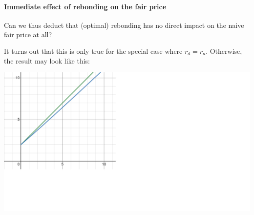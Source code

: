 \documentclass{article}
\begin{document}





\paragraph{Immediate effect of rebonding on the fair price}
Can we thus deduct that (optimal) rebonding has no direct impact on the naive fair price at all?

It turns out that this is only true for the special case where $r_d = r_a$. Otherwise, the result may look like this:

\includegraphics[width=\linewidth]{./ChickenBonds_Whitepaper_rebonding.png}
\end{document}
